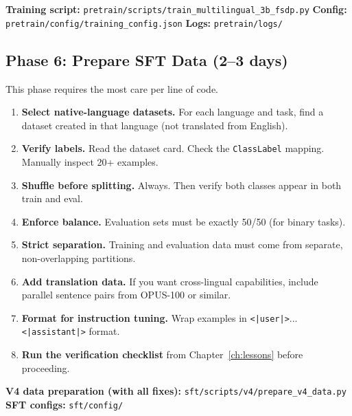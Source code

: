 \documentclass[11pt,a4paper]{article}
\begin{document}
\begin{reporef}
\textbf{Training script:} \texttt{pretrain/scripts/train\_multilingual\_3b\_fsdp.py}\hfill
\textbf{Config:} \texttt{pretrain/config/training\_config.json}\hfill
\textbf{Logs:} \texttt{pretrain/logs/}
\end{reporef}

\subsection{Phase 6: Prepare SFT Data (2--3 days)}

This phase requires the most care per line of code.

\begin{enumerate}
    \item \textbf{Select native-language datasets.} For each language and task, find a dataset created in that language (not translated from English).
    
    \item \textbf{Verify labels.} Read the dataset card. Check the \texttt{ClassLabel} mapping. Manually inspect 20+ examples.
    
    \item \textbf{Shuffle before splitting.} Always. Then verify both classes appear in both train and eval.
    
    \item \textbf{Enforce balance.} Evaluation sets must be exactly 50/50 (for binary tasks).
    
    \item \textbf{Strict separation.} Training and evaluation data must come from separate, non-overlapping partitions.
    
    \item \textbf{Add translation data.} If you want cross-lingual capabilities, include parallel sentence pairs from OPUS-100 or similar.
    
    \item \textbf{Format for instruction tuning.} Wrap examples in \texttt{<|user|>}...\texttt{<|assistant|>} format.
    
    \item \textbf{Run the verification checklist} from Chapter~\ref{ch:lessons} before proceeding.
\end{enumerate}

\begin{reporef}
\textbf{V4 data preparation (with all fixes):} \texttt{sft/scripts/v4/prepare\_v4\_data.py}\hfill
\textbf{SFT configs:} \texttt{sft/config/}
\end{reporef}
\end{document}
